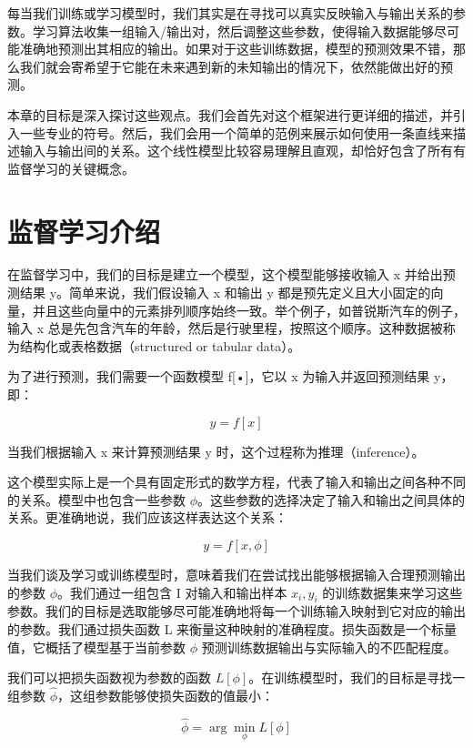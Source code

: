 \documentclass[lang=cn,newtx,10pt,scheme=chinese]{elegantbook}
\begin{document}
每当我们训练或学习模型时，我们其实是在寻找可以真实反映输入与输出关系的参数。学习算法收集一组输入/输出对，然后调整这些参数，使得输入数据能够尽可能准确地预测出其相应的输出。如果对于这些训练数据，模型的预测效果不错，那么我们就会寄希望于它能在未来遇到新的未知输出的情况下，依然能做出好的预测。

本章的目标是深入探讨这些观点。我们会首先对这个框架进行更详细的描述，并引入一些专业的符号。然后，我们会用一个简单的范例来展示如何使用一条直线来描述输入与输出间的关系。这个线性模型比较容易理解且直观，却恰好包含了所有有监督学习的关键概念。

\section{监督学习介绍}

在监督学习中，我们的目标是建立一个模型，这个模型能够接收输入 x 并给出预测结果 y。简单来说，我们假设输入 x 和输出 y 都是预先定义且大小固定的向量，并且这些向量中的元素排列顺序始终一致。举个例子，如普锐斯汽车的例子，输入 x 总是先包含汽车的年龄，然后是行驶里程，按照这个顺序。这种数据被称为结构化或表格数据（structured or tabular data）。

为了进行预测，我们需要一个函数模型 f[•]，它以 x 为输入并返回预测结果 y，即：

\begin{equation}
y = f[x] 
\end{equation}

当我们根据输入 x 来计算预测结果 y 时，这个过程称为推理（inference）。

这个模型实际上是一个具有固定形式的数学方程，代表了输入和输出之间各种不同的关系。模型中也包含一些参数 $\phi$。这些参数的选择决定了输入和输出之间具体的关系。更准确地说，我们应该这样表达这个关系：

\begin{equation}
y = f[x, \phi] 
\end{equation}

当我们谈及学习或训练模型时，意味着我们在尝试找出能够根据输入合理预测输出的参数 $\phi$。我们通过一组包含 I 对输入和输出样本 ${x_i, y_i}$ 的训练数据集来学习这些参数。我们的目标是选取能够尽可能准确地将每一个训练输入映射到它对应的输出的参数。我们通过损失函数 L 来衡量这种映射的准确程度。损失函数是一个标量值，它概括了模型基于当前参数 $\phi$ 预测训练数据输出与实际输入的不匹配程度。

我们可以把损失函数视为参数的函数 $L[\phi]$。在训练模型时，我们的目标是寻找一组参数 $\hat \phi$，这组参数能够使损失函数的值最小：

\begin{equation}
\hat \phi = \arg \mathop{\min}\limits_{\phi} L [\phi] 
\end{equation}
\end{document}
